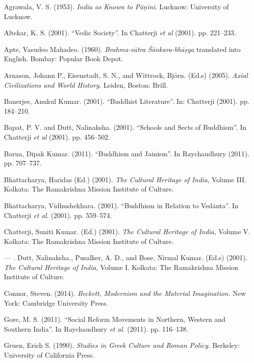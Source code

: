 \begin{thebibliography}{99}
\itemsep=1pt
 Agrawala, V. S. (1953). \textit{India as Known to Pāṇini}. Lucknow: University of Lucknow.

  Altekar, K. S. (2001). “Vedic Society”. In Chatterji \textit{et al} (2001). pp. 221–233.

  Apte, Vasudeo Mahadeo. (1960). \textit{Brahma-sūtra Śānkara-bhāṣya} translated into English. Bombay: Popular Book Depot.

  Arnason, Johann P., Eisenstadt, S. N., and Wittrock, Björn. (Ed.s) (2005). \textit{Axial Civilizations and World History}. Leiden, Boston: Brill.

  Banerjee, Anukul Kumar. (2001). “Buddhist Literature”. In: Chatterji (2001). pp. 184–210.

  Bapat, P. V. and Dutt, Nalinaksha. (2001). “Schools and Sects of Buddhism”. In Chatterji \textit{et al }(2001). pp. 456–502.

  Barua, Dipak Kumar. (2011). “Buddhism and Jainism”. In Raychaudhury (2011). pp. 707–737.

  Bhattacharya, Haridas (Ed.) (2001). \textit{The Cultural Heritage of India}, Volume III. Kolkata: The Ramakrishna Mission Institute of Culture.

  Bhattacharya, Vidhushekhara. (2001). “Buddhism in Relation to Vedānta”. In Chatterji \textit{et al}. (2001). pp. 559–574.

  Chatterji, Suniti Kumar. (Ed.) (2001). \textit{The Cultural Heritage of India}, Volume V. Kolkata: The Ramakrishna Mission Institute of Culture.

  — . Dutt, Nalinaksha., Pusalker, A. D., and Bose, Nirmal Kumar. (Ed.s) (2001). \textit{The Cultural Heritage of India}, Volume I. Kolkata: The Ramakrishna Mission Institute of Culture.

  Connor, Steven. (2014). \textit{Beckett, Modernism and the Material Imagination. }New York: Cambridge University Press.

  Gore, M. S. (2011). “Social Reform Movements in Northern, Western and Southern India”. In Raychaudhury \textit{et al.} (2011). pp. 116–138.

  Gruen, Erich S. (1990). \textit{Studies in Greek Culture and Roman Policy}. Berkeley: University of California Press.


\end{thebibliography}
